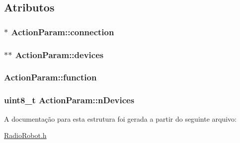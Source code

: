 \subsection{Atributos}
\hypertarget{structActionParam_aa60c9a775b490aa400ee7f41ba3675b6}{
\subsubsection[{connection}]{$\ast$ Action\-Param\-::connection}}\label{structActionParam_aa60c9a775b490aa400ee7f41ba3675b6}
\hypertarget{structActionParam_ae2bd1ab1159fb44cf8fd8ac2419ca22b}{
\subsubsection[{devices}]{$\ast$$\ast$ Action\-Param\-::devices}}\label{structActionParam_ae2bd1ab1159fb44cf8fd8ac2419ca22b}
\hypertarget{structActionParam_adc96d4af3e9557b28f39b0da38b502aa}{
\subsubsection[{function}]{ Action\-Param\-::function}}\label{structActionParam_adc96d4af3e9557b28f39b0da38b502aa}
\hypertarget{structActionParam_ad3eac6b0a11195bfb750202541506fdd}{
\subsubsection[{n\-Devices}]{\setlength{\rightskip}{0pt plus 5cm}uint8\-\_\-t Action\-Param\-::n\-Devices}}\label{structActionParam_ad3eac6b0a11195bfb750202541506fdd}


A documentação para esta estrutura foi gerada a partir do seguinte arquivo\-:\begin{DoxyCompactItemize}
\item 
\hyperlink{RadioRobot_8h}{Radio\-Robot.\-h}\end{DoxyCompactItemize}
